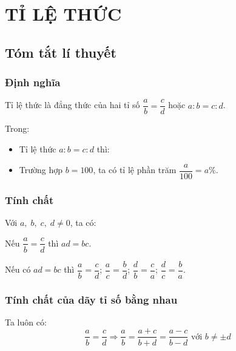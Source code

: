 \section{TỈ LỆ THỨC}
\subsection{Tóm tắt lí thuyết}
\subsubsection{Định nghĩa}
Tỉ lệ thức là đẳng thức của hai tỉ số $\dfrac{a}{b} = \dfrac{c}{d}$ hoặc $a:b = c:d$.
\begin{note}
	Trong:
	\begin{itemize}
		\item Tỉ lệ thức $a:b = c:d$ thì:
		\item Trường hợp $b=100$, ta có tỉ lệ phần trăm $\dfrac{a}{100} = a \% $.
	\end{itemize}
\end{note}
\subsubsection{Tính chất}
Với $a, \; b, \; c, \; d \ne 0$, ta có:
\begin{tc}
	Nếu $\dfrac{a}{b} = \dfrac{c}{d}$ thì $ad = bc$.
\end{tc}
\begin{tc}
	Nếu có $ad = bc$ thì $\dfrac{a}{b} = \dfrac{c}{d}$; $\dfrac{a}{c} = \dfrac{b}{d}$; $\dfrac{d}{b} = \dfrac{c}{a}$; $\dfrac{d}{c} = \dfrac{b}{a}$.
\end{tc}
\subsubsection{Tính chất của dãy tỉ số bằng nhau}
Ta luôn có:
\[\dfrac{a}{b} = \dfrac{c}{d} \Rightarrow \dfrac{a}{b} = \dfrac{a+c}{b+d} = \dfrac{a-c}{b-d} \text{ với } b \ne \pm d\]

